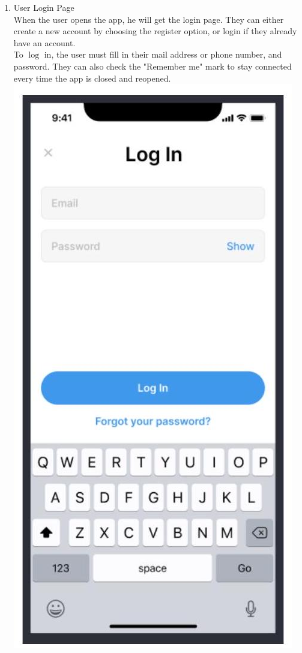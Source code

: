 \documentclass[10pt]{article}
\begin{document}
\begin{enumerate}
  \item {User Login Page} \\
  When the user opens the app, he will get the login page. They can either create a new account by choosing the register option, or login if they already have an account. \\
  To $\log$ in, the user must fill in their mail address or phone number, and password. They can also check the "Remember me" mark to stay connected every time the app is closed and reopened. \\
  \includegraphics[max width=\textwidth]{2022_11_16_e80008f3d60227bff292g-4}


\end{enumerate}
\end{document}

